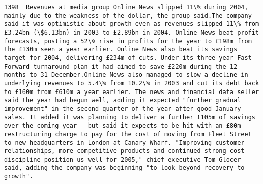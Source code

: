 \documentclass[11pt]{article}
\begin{document}
\begin{Verbatim}[commandchars=\\\{\}]
         1398  Revenues at media group Online News slipped 11\% during 2004, mainly due to the weakness of the dollar, the group said.The company said it was optimistic about growth even as revenues slipped 11\% from £3.24bn (\$6.13bn) in 2003 to £2.89bn in 2004. Online News beat profit forecasts, posting a 52\% rise in profits for the year to £198m from the £130m seen a year earlier. Online News also beat its savings target for 2004, delivering £234m of cuts. Under its three-year Fast Forward turnaround plan it had aimed to save £220m during the 12 months to 31 December.Online News also managed to slow a decline in underlying revenues to 5.4\% from 10.2\% in 2003 and cut its debt back to £160m from £610m a year earlier. The news and financial data seller said the year had begun well, adding it expected "further gradual improvement" in the second quarter of the year after good January sales. It added it was planning to deliver a further £105m of savings over the coming year - but said it expects to be hit with an £80m restructuring charge to pay for the cost of moving from Fleet Street to new headquarters in London at Canary Wharf. "Improving customer relationships, more competitive products and continued strong cost discipline position us well for 2005," chief executive Tom Glocer said, adding the company was beginning "to look beyond recovery to growth".                                                                                                                                                                                                                                                                                                                                                                                                                                                                                                                                                                                                                                                                                                                                                                                                                                                                                                                                                                                                                                                                                                                                                                                                                                                                                                                                                                                                                                                                                                                                                                                                                                                                                                                                                                                                                                                                                                                                                                                                
\end{Verbatim}
\end{document}

